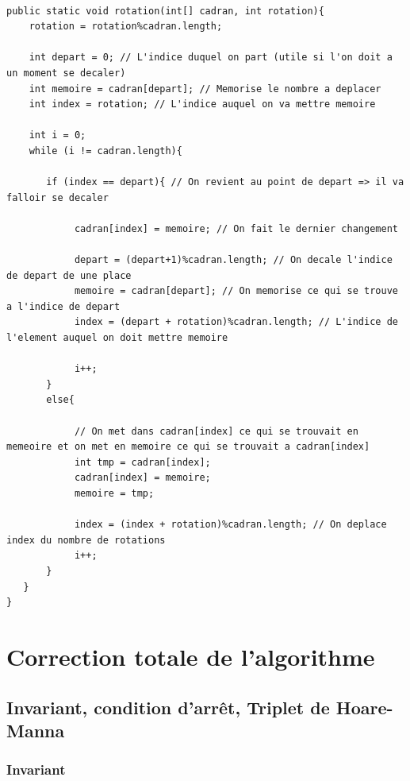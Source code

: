 \documentclass[a4paper, 12pt]{article}
\begin{document}
\begin{lstlisting}[frame=single]

public static void rotation(int[] cadran, int rotation){
    rotation = rotation%cadran.length;
        
    int depart = 0; // L'indice duquel on part (utile si l'on doit a un moment se decaler)
    int memoire = cadran[depart]; // Memorise le nombre a deplacer
    int index = rotation; // L'indice auquel on va mettre memoire
        
    int i = 0;
    while (i != cadran.length){
           
       if (index == depart){ // On revient au point de depart => il va falloir se decaler
                
            cadran[index] = memoire; // On fait le dernier changement

            depart = (depart+1)%cadran.length; // On decale l'indice de depart de une place
            memoire = cadran[depart]; // On memorise ce qui se trouve a l'indice de depart
            index = (depart + rotation)%cadran.length; // L'indice de l'element auquel on doit mettre memoire
                
        	i++;
       }
       else{
                
            // On met dans cadran[index] ce qui se trouvait en memeoire et on met en memoire ce qui se trouvait a cadran[index]
            int tmp = cadran[index];
            cadran[index] = memoire;
            memoire = tmp;
                
            index = (index + rotation)%cadran.length; // On deplace index du nombre de rotations
            i++;
       }
   }
}

\end{lstlisting} 

\section{Correction totale de l'algorithme}
\subsection{Invariant, condition d'arrêt, Triplet de Hoare-Manna}
\subsubsection*{Invariant}

\vspace{0.2cm}
\end{document}

